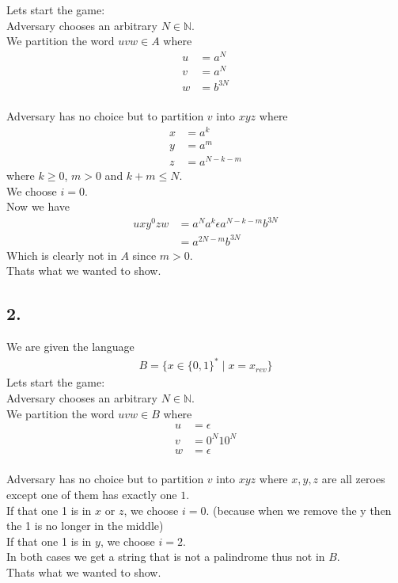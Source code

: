 \documentclass{article}
\begin{document}
Lets start the game: \\
Adversary chooses an arbitrary \(N \in \mathbb{N}\). \\
We partition the word \(uvw \in A\) where
\begin{align*}
   u &= a^{N} \\
   v &= a^{N} \\
   w &= b^{3N}
\end{align*}
\\
Adversary has no choice but to partition \(v\) into \(xyz\) where
\begin{align*}
   x &= a^{k} \\
   y &= a^{m} \\
   z &= a^{N - k - m}
\end{align*}
where \(k \geq 0\), \(m > 0\) and \(k + m \leq N\). \\
We choose \(i = 0\). \\
Now we have
\begin{align*}
   u x y^0 z w &= a^{N} a^{k} \epsilon a^{N - k - m} b^{3N} \\
               &= a^{2N - m} b^{3N}
\end{align*}
Which is clearly not in \(A\) since \(m > 0\). \\
Thats what we wanted to show.

\subsection*{2.}
We are given the language
\begin{align*}
   B = \{x \in \{0, 1\}^* \mid x = x_{rev}\}
\end{align*}
Lets start the game: \\
Adversary chooses an arbitrary \(N \in \mathbb{N}\). \\
We partition the word \(uvw \in B\) where
\begin{align*}
   u &= \epsilon \\
   v &= 0^{N}10^{N} \\
   w &= \epsilon
\end{align*}
\\
Adversary has no choice but to partition \(v\) into \(xyz\) where \(x, y, z\) are all zeroes except one of them has exactly one \(1\). \\
If that one 1 is in \(x\) or \(z\), we choose \(i = 0\). (because when we remove the y then the 1 is no longer in the middle) \\
If that one 1 is in \(y\), we choose \(i = 2\). \\
In both cases we get a string that is not a palindrome thus not in \(B\). \\
Thats what we wanted to show.
\end{document}
